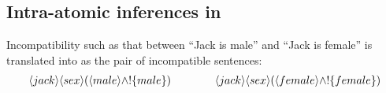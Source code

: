 \subsection{Intra-atomic inferences in \cathoristic{}}

Incompatibility such as that between ``Jack is male'' and ``Jack is
female'' is translated into \cathoristic{} as the pair of incompatible
sentences:
\begin{eqnarray*}
\langle jack \rangle \langle sex \rangle (\langle male \rangle \land ! \{male\}) 
   \qquad\qquad
\langle jack \rangle \langle sex \rangle (\langle female \rangle \land ! \{female\})
\end{eqnarray*}

